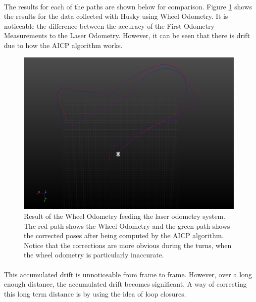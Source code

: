 \documentclass[11pt]{article}
\begin{document}
	\paragraph{}
	The results for each of the paths are shown below for comparison. Figure \ref{fig:LaserOdometry1} shows the results for the data collected with Husky using Wheel Odometry. It is noticeable the difference between the accuracy of the First Odometry Measurements to the Laser Odometry. However, it can be seen that there is drift due to how the AICP algorithm works.
	\begin{figure}
	\begin{minipage}{0.65\textwidth}
		\centering
		\includegraphics[width=\textwidth]{LaserOdometry1}
	\end{minipage} \hfill
	\begin{minipage}{0.35\textwidth}
		\centering
		\caption[t]{Result of the Wheel Odometry feeding the laser odometry system. The red path shows the Wheel Odometry and the green path shows the corrected poses after being computed by the AICP algorithm. Notice that the corrections are more obvious during the turns, when the wheel odometry is particularly inaccurate.}
		\label{fig:LaserOdometry1}	
	\end{minipage}				
	\end{figure}
	\paragraph{}
	This accumulated drift is unnoticeable from frame to frame. However, over a long enough distance, the accumulated drift becomes significant. A way of correcting this long term distance is by using the idea of loop closures.
	
\end{document}
